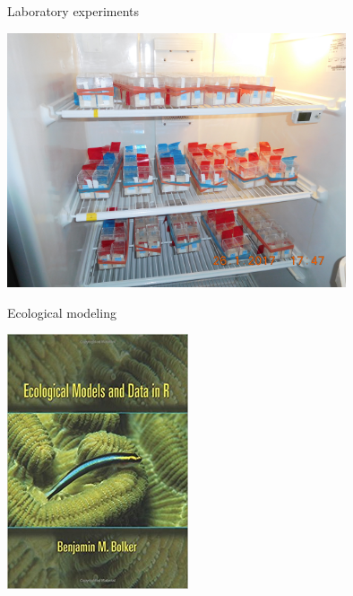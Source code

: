 \documentclass[12pt]{beamer}
\begin{document}
\begin{frame}

	\begin{flushright}
	  \Large \textcolor{boss2}{Laboratory experiments} 
	\end{flushright}
  \begin{center}
    \includegraphics[width=0.75\textwidth]{figs/lab.jpg}
  \end{center}
  \let\thefootnote\relax{}
\end{frame}








\begin{frame}

	\begin{flushright}
	  \Large \textcolor{boss2}{Ecological modeling} 
	\end{flushright}


  \begin{center}
    \includegraphics[width=0.4\textwidth]{figs/models.jpg}
  \end{center}
  \let\thefootnote\relax{}
\end{frame}
\end{document}
